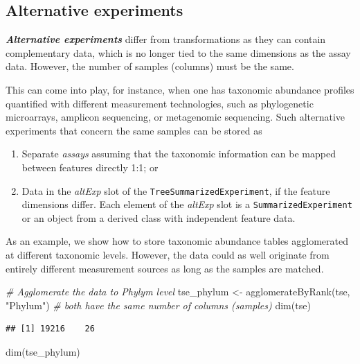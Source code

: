 \documentclass[
]{book}
\newenvironment{Shaded}{\begin{snugshade}}{\end{snugshade}}
\newcommand{\CommentTok}[1]{\textcolor[rgb]{0.56,0.35,0.01}{\textit{#1}}}
\newcommand{\FunctionTok}[1]{\textcolor[rgb]{0.00,0.00,0.00}{#1}}
\newcommand{\NormalTok}[1]{#1}
\newcommand{\OtherTok}[1]{\textcolor[rgb]{0.56,0.35,0.01}{#1}}
\newcommand{\StringTok}[1]{\textcolor[rgb]{0.31,0.60,0.02}{#1}}
\providecommand{\tightlist}{%
  \setlength{\itemsep}{0pt}\setlength{\parskip}{0pt}}
\begin{document}
\hypertarget{alt-exp}{%
\subsection{Alternative experiments}\label{alt-exp}}

\emph{\textbf{Alternative experiments}} differ from transformations as they can
contain complementary data, which is no longer tied to the same
dimensions as the assay data. However, the number of samples (columns)
must be the same.

This can come into play, for instance, when one has taxonomic abundance
profiles quantified with different measurement technologies, such as
phylogenetic microarrays, amplicon sequencing, or metagenomic
sequencing. Such alternative experiments that concern the same samples
can be stored as

\begin{enumerate}
\def\labelenumi{\arabic{enumi}.}
\tightlist
\item
  Separate \emph{assays} assuming that the taxonomic information can be mapped
  between features directly 1:1; or
\item
  Data in the \emph{altExp} slot of the \texttt{TreeSummarizedExperiment}, if the feature
  dimensions differ. Each element of the \emph{altExp} slot is a \texttt{SummarizedExperiment}
  or an object from a derived class with independent feature data.
\end{enumerate}

As an example, we show how to store taxonomic abundance tables
agglomerated at different taxonomic levels. However, the data could as
well originate from entirely different measurement sources as long as
the samples are matched.

\begin{Shaded}
\begin{Highlighting}[]
\CommentTok{\# Agglomerate the data to Phylym level}
\NormalTok{tse\_phylum }\OtherTok{\textless{}{-}} \FunctionTok{agglomerateByRank}\NormalTok{(tse, }\StringTok{"Phylum"}\NormalTok{)}
\CommentTok{\# both have the same number of columns (samples)}
\FunctionTok{dim}\NormalTok{(tse)}
\end{Highlighting}
\end{Shaded}

\begin{verbatim}
## [1] 19216    26
\end{verbatim}

\begin{Shaded}
\begin{Highlighting}[]
\FunctionTok{dim}\NormalTok{(tse\_phylum)}
\end{Highlighting}
\end{Shaded}
\end{document}
